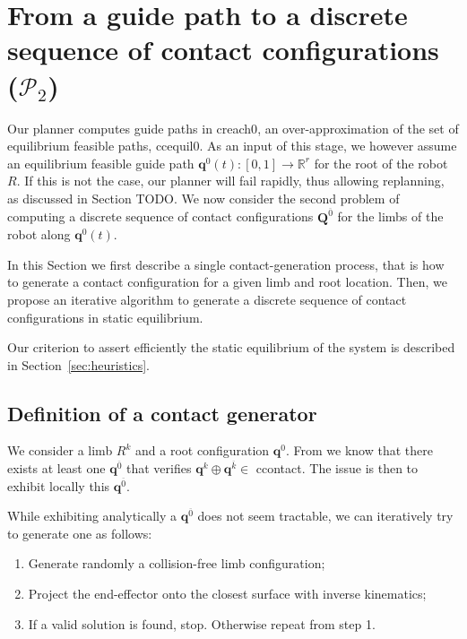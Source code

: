 \section{From a guide path to a discrete sequence of contact configurations ($\mathcal{P}_2$)}
\label{sec:contact}
Our planner computes guide paths in \gls{creach0}, an over-approximation of the set of \gls{equilibrium feasible} paths, \gls{ccequil0}.
As an input of this stage, we however assume an \gls{equilibrium feasible} guide path $\mathbf{q}^0(t) : [0,1] \longrightarrow \mathbb{R}^r$ for the root of the robot $R$.
If this is not the case, our planner will fail rapidly, thus allowing replanning, as discussed in Section TODO.
We now consider the second problem of computing a discrete sequence of contact configurations $\mathbf{Q}^{\overline{0}}$ for the limbs of the robot along $\mathbf{q}^0(t)$.

In this Section we first describe a single contact-generation process, that is how to generate a contact configuration for a given limb 
and root location.
Then, we propose an iterative algorithm to generate a discrete sequence of contact configurations in static equilibrium.

Our criterion to assert efficiently the static equilibrium of the system
is described in Section~\ref{sec:heuristics}.

\subsection{Definition of a contact generator}
\label{sec:single_contact}
We consider a limb $R^k$  and a root configuration $\mathbf{q}^0$.
From  we know that there exists at least one $\mathbf{q}^{\overline{0}}$ that verifies $\mathbf{q}^k \oplus \mathbf{q}^{\overline{k}} \in$ \gls{ccontact}.
The issue is then to exhibit locally this $\mathbf{q}^{\overline{0}}$.

While exhibiting analytically a $\mathbf{q}^{\overline{0}}$ does not seem tractable, we can iteratively try to generate one as follows:
\begin{enumerate}
\item Generate randomly a collision-free limb configuration;
\item Project the end-effector onto the closest surface with inverse kinematics;
\item If a valid solution is found, stop. Otherwise repeat from step 1.
\end{enumerate}


